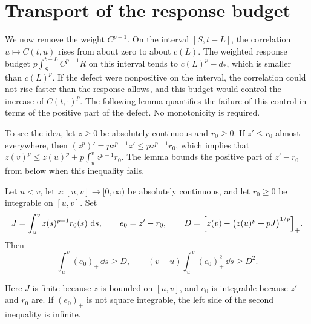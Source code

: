 \section{Transport of the response budget}\label{sec:viol-transport}

We now remove the weight $C^{p-1}$. On the interval $[S,t-L]$, the correlation $u\mapsto C(t,u)$ rises from about zero to about $c(L)$. The weighted response budget $p\int_S^{t-L}C^{p-1}R$ on this interval tends to $c(L)^p-d_*$, which is smaller than $c(L)^p$. If the defect were nonpositive on the interval, the correlation could not rise faster than the response allows, and this budget would control the increase of $C(t,\cdot)^p$. The following lemma quantifies the failure of this control in terms of the positive part of the defect. No monotonicity is required.

To see the idea, let $z\ge0$ be absolutely continuous and $r_0\ge0$. If $z'\le r_0$ almost everywhere, then $(z^p)'=pz^{p-1}z'\le pz^{p-1}r_0$, which implies that $z(v)^p\le z(u)^p+p\int_u^vz^{p-1}r_0$. The lemma bounds the positive part of $z'-r_0$ from below when this inequality fails.

\begin{lemma}
\label{resp:transport}
Let $u<v$, let $z:[u,v]\to[0,\infty)$ be absolutely continuous, and let $r_0\ge0$ be integrable on $[u,v]$. Set
\[
 J=\int_u^vz(s)^{p-1}r_0(s)\,\mathop{}\!\mathrm d s,
 \qquad e_0=z'-r_0,
 \qquad D=\Bigl[z(v)-\bigl(z(u)^p+pJ\bigr)^{1/p}\Bigr]_+.
\]
Then
\begin{equation}
 \int_u^v(e_0)_+\,\dd s\ge D,
 \qquad (v-u)\int_u^v(e_0)_+^2\,\dd s\ge D^2.
 \label{resp:transport-bound}
\end{equation}
\end{lemma}

Here $J$ is finite because $z$ is bounded on $[u,v]$, and $e_0$ is integrable because $z'$ and $r_0$ are. If $(e_0)_+$ is not square integrable, the left side of the second inequality is infinite.

